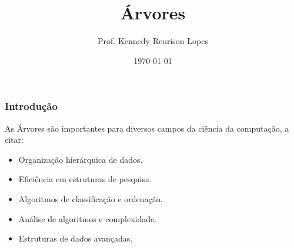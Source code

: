 \documentclass[12pt]{beamer}
\title{Árvores}
\author{Prof. Kennedy Reurison Lopes}
\date{\today}
\begin{document}
\frame{\titlepage}

\begin{frame}[t]
    \frametitle{Introdução}
    As Árvores são importantes para diversos campos da ciência da computação, a citar:
    \begin{itemize}
        \item Organização hierárquica de dados.
        \item Eficiência em estruturas de pesquisa.
        \item Algoritmos de classificação e ordenação.
        \item Análise de algoritmos e complexidade.
        \item Estruturas de dados avançadas.
    \end{itemize}

\end{frame}
\end{document}
